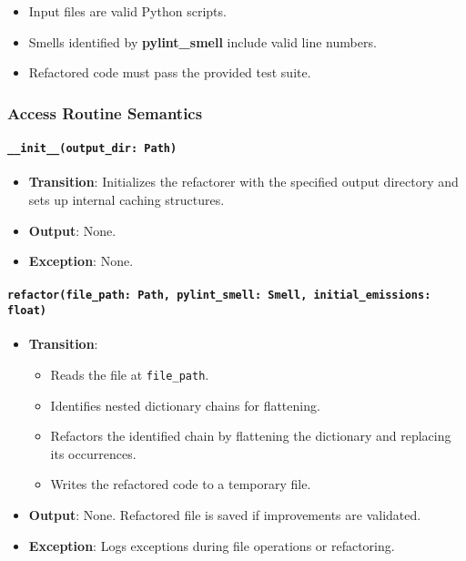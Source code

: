 \documentclass[12pt, titlepage]{article}
\begin{document}
\begin{itemize}
  \item Input files are valid Python scripts.
  \item Smells identified by \textbf{pylint\_smell} include valid line numbers.
  \item Refactored code must pass the provided test suite.
\end{itemize}

\subsubsection{Access Routine Semantics}

\paragraph{\texttt{\_\_init\_\_(output\_dir: Path)}}
\begin{itemize}
\item \textbf{Transition}: Initializes the refactorer with the specified output directory and sets up internal caching structures.
\item \textbf{Output}: None.
\item \textbf{Exception}: None.
\end{itemize}

\paragraph{\texttt{refactor(file\_path: Path, pylint\_smell: Smell, initial\_emissions: float)}}
\begin{itemize}
  \item \textbf{Transition}:
    \begin{itemize}
      \item Reads the file at \texttt{file\_path}.
      \item Identifies nested dictionary chains for flattening.
      \item Refactors the identified chain by flattening the dictionary and replacing its occurrences.
      \item Writes the refactored code to a temporary file.
\end{itemize}
  \item \textbf{Output}: None. Refactored file is saved if improvements are validated.
  \item \textbf{Exception}: Logs exceptions during file operations or refactoring.
\end{itemize}
\end{document}
